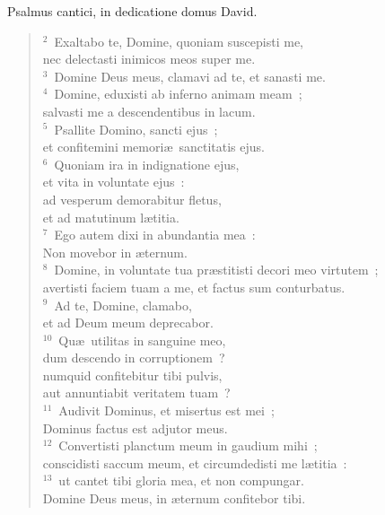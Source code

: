 \lettrine[lines=3,image=true,loversize=0.05,lraise=-0.03]{P}{}salmus cantici, in dedicatione domus David.
\begin{flushleft}\begin{verse}\vspace{6pt}${}^{2}$~Exaltabo te, Domine, quoniam suscepisti me,\\ nec delectasti inimicos meos super me.\\
${}^{3}$~Domine Deus meus, clamavi ad te, et sanasti me.\\
${}^{4}$~Domine, eduxisti ab inferno animam meam~;\\ salvasti me a descendentibus in lacum.\\
${}^{5}$~Psallite Domino, sancti ejus~;\\ et confitemini memori\ae\ sanctitatis ejus.\\
${}^{6}$~Quoniam ira in indignatione ejus,\\ et vita in voluntate ejus~:\\ ad vesperum demorabitur fletus,\\ et ad matutinum l\ae titia.\\
${}^{7}$~Ego autem dixi in abundantia mea~:\\ Non movebor in \ae ternum.\\
${}^{8}$~Domine, in voluntate tua pr\ae stitisti decori meo virtutem~;\\ avertisti faciem tuam a me, et factus sum conturbatus.\\
${}^{9}$~Ad te, Domine, clamabo,\\ et ad Deum meum deprecabor.\\
${}^{10}$~Qu\ae\ utilitas in sanguine meo,\\ dum descendo in corruptionem~?\\ numquid confitebitur tibi pulvis,\\ aut annuntiabit veritatem tuam~?\\
${}^{11}$~Audivit Dominus, et misertus est mei~;\\ Dominus factus est adjutor meus.\\
${}^{12}$~Convertisti planctum meum in gaudium mihi~;\\ conscidisti saccum meum, et circumdedisti me l\ae titia~:\\
${}^{13}$~ut cantet tibi gloria mea, et non compungar.\\ Domine Deus meus, in \ae ternum confitebor tibi.\end{verse}\end{flushleft}




